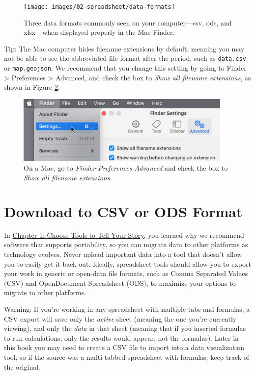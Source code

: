 \documentclass[
  english,
]{book}
\begin{document}
\begin{figure}
\texttt{[image: images/02-spreadsheet/data-formats]} \caption{Three data formats commonly seen on your computer---csv, ods, and xlsx---when displayed properly in the Mac Finder.}\label{fig:data-formats}
\end{figure}

Tip: The Mac computer hides filename extensions by default, meaning you may not be able to see the abbreviated file format after the period, such as \texttt{data.csv} or \texttt{map.geojson}. We recommend that you change this setting by going to Finder \textgreater{} Preferences \textgreater{} Advanced, and check the box to \emph{Show all filename extensions}, as shown in Figure \ref{fig:mac-file-extensions}.



\begin{figure}
\includegraphics[width=400px]{images/02-spreadsheet/mac-file-extensions} \caption{On a Mac, go to \emph{Finder-Preferences-Advanced} and check the box to \emph{Show all filename extensions}.}\label{fig:mac-file-extensions}
\end{figure}

\hypertarget{csv}{%
\section*{Download to CSV or ODS Format}\label{csv}}

In \href{choose.html}{Chapter 1: Choose Tools to Tell Your Story}, you learned why we recommend software that supports portability, so you can migrate data to other platforms as technology evolves. Never upload important data into a tool that doesn't allow you to easily get it back out. Ideally, spreadsheet tools should allow you to export your work in generic or open-data file formats, such as Comma Separated Values (CSV) and OpenDocument Spreadsheet (ODS), to maximize your options to migrate to other platforms.

Warning: If you're working in any spreadsheet with multiple tabs and formulas, a CSV export will save only the \emph{active} sheet (meaning the one you're currently viewing), and only the \emph{data} in that sheet (meaning that if you inserted formulas to run calculations, only the results would appear, not the formulas). Later in this book you may need to create a CSV file to import into a data visualization tool, so if the source was a multi-tabbed spreadsheet with formulas, keep track of the original.
\end{document}
